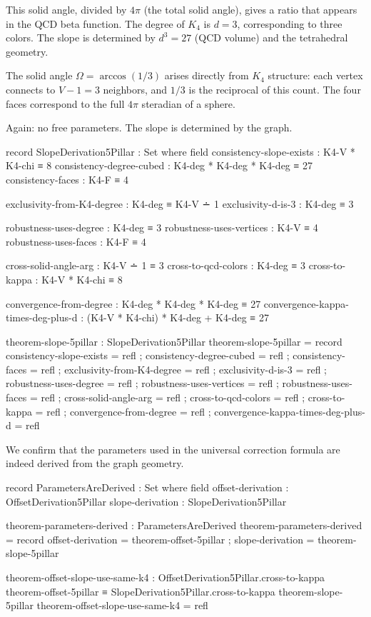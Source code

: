 \documentclass[11pt,a4paper]{book}
\begin{document}
This solid angle, divided by $4\pi$ (the total solid angle), gives a ratio that appears in the QCD beta function.
The degree of $K_4$ is $d = 3$, corresponding to three colors. The slope is determined by $d^3 = 27$ (QCD volume) and the tetrahedral geometry.

The solid angle $\Omega = \arccos(1/3)$ arises directly from $K_4$ structure: each vertex connects to $V - 1 = 3$ neighbors, and $1/3$ is the reciprocal of this count. The four faces correspond to the full $4\pi$ steradian of a sphere.

Again: no free parameters. The slope is determined by the graph.

\begin{code}
record SlopeDerivation5Pillar : Set where
  field
    consistency-slope-exists : K4-V * K4-chi ≡ 8
    consistency-degree-cubed : K4-deg * K4-deg * K4-deg ≡ 27
    consistency-faces : K4-F ≡ 4
    
    exclusivity-from-K4-degree : K4-deg ≡ K4-V ∸ 1
    exclusivity-d-is-3 : K4-deg ≡ 3
    
    robustness-uses-degree : K4-deg ≡ 3
    robustness-uses-vertices : K4-V ≡ 4
    robustness-uses-faces : K4-F ≡ 4
    
    cross-solid-angle-arg : K4-V ∸ 1 ≡ 3
    cross-to-qcd-colors : K4-deg ≡ 3
    cross-to-kappa : K4-V * K4-chi ≡ 8
    
    convergence-from-degree : K4-deg * K4-deg * K4-deg ≡ 27
    convergence-kappa-times-deg-plus-d : (K4-V * K4-chi) * K4-deg + K4-deg ≡ 27

theorem-slope-5pillar : SlopeDerivation5Pillar
theorem-slope-5pillar = record
  { consistency-slope-exists = refl
  ; consistency-degree-cubed = refl
  ; consistency-faces = refl
  ; exclusivity-from-K4-degree = refl
  ; exclusivity-d-is-3 = refl
  ; robustness-uses-degree = refl
  ; robustness-uses-vertices = refl
  ; robustness-uses-faces = refl
  ; cross-solid-angle-arg = refl
  ; cross-to-qcd-colors = refl
  ; cross-to-kappa = refl
  ; convergence-from-degree = refl
  ; convergence-kappa-times-deg-plus-d = refl
  }
\end{code}

We confirm that the parameters used in the universal correction formula are indeed derived from the graph geometry.

\begin{code}
record ParametersAreDerived : Set where
  field
    offset-derivation : OffsetDerivation5Pillar
    slope-derivation : SlopeDerivation5Pillar

theorem-parameters-derived : ParametersAreDerived
theorem-parameters-derived = record
  { offset-derivation = theorem-offset-5pillar
  ; slope-derivation = theorem-slope-5pillar
  }

theorem-offset-slope-use-same-k4 : 
  OffsetDerivation5Pillar.cross-to-kappa theorem-offset-5pillar ≡ 
  SlopeDerivation5Pillar.cross-to-kappa theorem-slope-5pillar
theorem-offset-slope-use-same-k4 = refl

\end{code}
\end{document}
